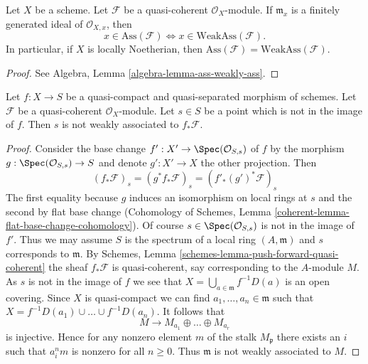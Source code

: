 \begin{lemma}
\label{lemma-ass-weakly-ass}
Let $X$ be a scheme.
Let $\mathcal{F}$ be a quasi-coherent $\mathcal{O}_X$-module.
If $\mathfrak m_x$ is a finitely generated ideal of $\mathcal{O}_{X, x}$,
then
$$
x \in \text{Ass}(\mathcal{F}) \Leftrightarrow
x \in \text{WeakAss}(\mathcal{F}).
$$
In particular, if $X$ is locally Noetherian, then
$\text{Ass}(\mathcal{F}) = \text{WeakAss}(\mathcal{F})$.
\end{lemma}

\begin{proof}
See
Algebra, Lemma \ref{algebra-lemma-ass-weakly-ass}.
\end{proof}

\begin{lemma}
\label{lemma-weakass-pushforward}
Let $f : X \to S$ be a quasi-compact and quasi-separated morphism of schemes.
Let $\mathcal{F}$ be a quasi-coherent $\mathcal{O}_X$-module.
Let $s \in S$ be a point which is not in the image of $f$. Then
$s$ is not weakly associated to $f_*\mathcal{F}$.
\end{lemma}

\begin{proof}
Consider the base change $f' : X' \to \Spec(\mathcal{O}_{S, s})$
of $f$ by the morphism $g : \Spec(\mathcal{O}_{S, s}) \to S$
and denote $g' : X' \to X$ the other projection.
Then
$$
(f_*\mathcal{F})_s = (g^*f_*\mathcal{F})_s = (f'_*(g')^*\mathcal{F})_s
$$
The first equality because $g$ induces an isomorphism on local
rings at $s$ and the second by flat base change (Cohomology of Schemes, Lemma
\ref{coherent-lemma-flat-base-change-cohomology}). Of course
$s \in \Spec(\mathcal{O}_{S, s})$ is not in the image of $f'$.
Thus we may assume $S$ is the spectrum of a local ring
$(A, \mathfrak m)$ and $s$ corresponds to $\mathfrak m$.
By Schemes, Lemma \ref{schemes-lemma-push-forward-quasi-coherent}
the sheaf $f_*\mathcal{F}$ is quasi-coherent, say corresponding
to the $A$-module $M$. As $s$ is not in the image of $f$ we see that
$X = \bigcup_{a \in \mathfrak m} f^{-1}D(a)$ is an open covering.
Since $X$ is quasi-compact we can find $a_1, \ldots, a_n \in \mathfrak m$
such that $X = f^{-1}D(a_1) \cup \ldots \cup f^{-1}D(a_n)$. It follows
that
$$
M \to M_{a_1} \oplus \ldots \oplus M_{a_r}
$$
is injective. Hence for any nonzero element $m$ of the stalk $M_\mathfrak p$
there exists an $i$ such that $a_i^n m$ is nonzero for all $n \geq 0$.
Thus $\mathfrak m$ is not weakly associated to $M$.
\end{proof}

